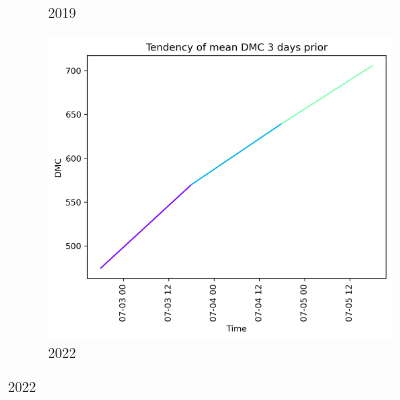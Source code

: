 \begin{figure}[h]
\begin{subfigure}{0.3\textwidth}
		\caption{2019}
		\label{fig:dmc_prior_3_days_2019}
	\end{subfigure}
	\hfill
	\begin{subfigure}{0.3\textwidth}
		\centering
		\includegraphics[width=\textwidth]{graphs/3days/2022_3daysprior_tendency_graph_DMC.png}
		\caption{2022}
		\label{fig:dmc_prior_3_days_2022}
	\end{subfigure}
	
	\label{fig:dmc_values_3days_prior}
\end{figure}

